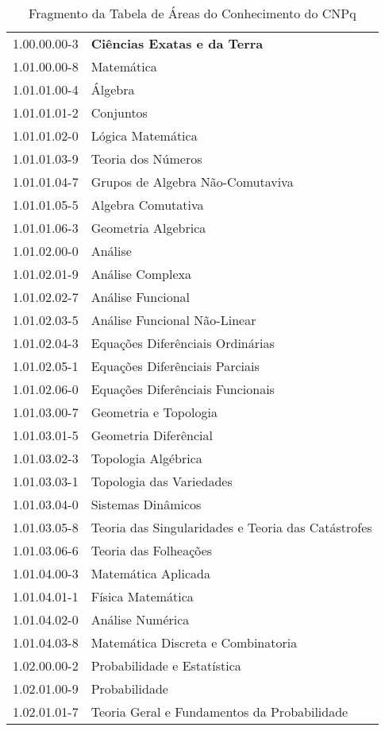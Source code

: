 \begin{longtable}[c]{p{2.15cm}p{13cm}}
\caption{Fragmento da Tabela de Áreas do Conhecimento do CNPq}
\label{tab:areas-conhecimento}\\
1.00.00.00-3 & \textbf{Ciências Exatas e da Terra} \\
1.01.00.00-8 & Matemática \\
1.01.01.00-4 & Álgebra \\
1.01.01.01-2 & Conjuntos \\
1.01.01.02-0 & Lógica Matemática \\
1.01.01.03-9 & Teoria dos Números \\
1.01.01.04-7 & Grupos de Algebra Não-Comutaviva \\
1.01.01.05-5 & Algebra Comutativa \\
1.01.01.06-3 & Geometria Algebrica \\
1.01.02.00-0 & Análise \\
1.01.02.01-9 & Análise Complexa \\
1.01.02.02-7 & Análise Funcional \\
1.01.02.03-5 & Análise Funcional Não-Linear \\
1.01.02.04-3 & Equações Diferênciais Ordinárias \\
1.01.02.05-1 & Equações Diferênciais Parciais \\
1.01.02.06-0 & Equações Diferênciais Funcionais \\
1.01.03.00-7 & Geometria e Topologia \\
1.01.03.01-5 & Geometria Diferêncial \\
1.01.03.02-3 & Topologia Algébrica \\
1.01.03.03-1 & Topologia das Variedades \\
1.01.03.04-0 & Sistemas Dinâmicos \\
1.01.03.05-8 & Teoria das Singularidades e Teoria das Catástrofes \\
1.01.03.06-6 & Teoria das Folheações \\
1.01.04.00-3 & Matemática Aplicada \\
1.01.04.01-1 & Física Matemática \\
1.01.04.02-0 & Análise Numérica \\
1.01.04.03-8 & Matemática Discreta e Combinatoria \\
1.02.00.00-2 & Probabilidade e Estatística \\
1.02.01.00-9 & Probabilidade \\
1.02.01.01-7 & Teoria Geral e Fundamentos da Probabilidade \\

\end{longtable}
